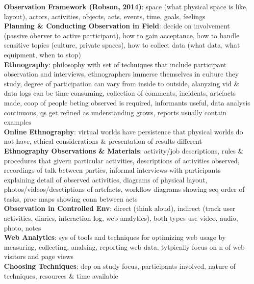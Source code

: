 \documentclass[a4paper]{article}
\begin{document}
\begin{multicols}{3}
        \textbf{Observation Framework (Robson, 2014)}: space (what physical space is like, layout), actors, activities, objects, acts, events, time, goals, feelings\\
        \textbf{Planning \& Conducting Observation in Field}: decide on involvement (passive oberver to active participant), how to gain acceptance, how to handle sensitive topics (culture, private spaces), how to collect data (what data, what equipment, when to stop)\\
        \textbf{Ethnography}: philosophy with set of techniques that include participant observation and interviews, ethnographers immerse themselves in culture they study, degree of participation can vary from inside to outside, alanyzing vid \& data logs can be time consuming, collection of comments, incidents, artefacts made, coop of people beting observed is required, informants useful, data analysis continuous, qs get refined as understanding grows, reports usually contain examples\\
        \textbf{Online Ethnography}: virtual worlds have persistence that physical worlds do not have, ethical considerations \& presentation of results different\\
        \textbf{Ethnography Observations \& Materials}: activity/job descriptions, rules \& procedures that givern particular activities, descriptions of activities observed, recordings of talk between parties, informal interviews with participants explaining detail of observed activities, diagrams of physical layout, photos/videos/desctiptions of artefacts, workflow diagrams showing seq order of tasks, proc maps showing conn between acts\\
        \textbf{Observation in Controlled Env}: direct (think aloud), indirect (track user activities, diaries, interaction log, web analytics), both types use video, audio, photo, notes\\
        \textbf{Web Analytics}: sys of tools and techniques for optimizing web usage by measuring, collecting, analsing, reporting web data, tytpically focus on n of web visitors and page views\\
        \textbf{Choosing Techniques}: dep on study focus, participants involved, nature of techniques, resources \& time available\\
    \end{multicols}
    
\end{document}
